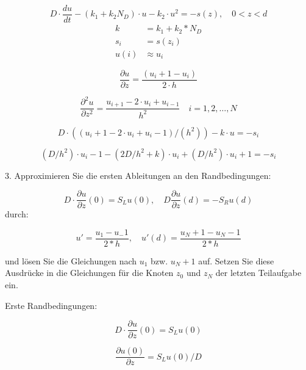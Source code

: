 \begin{equation}
	D\cdot \frac{du}{dt} -\left( k_1 +k_2 N_D\right)\cdot u-k_2\cdot u^2=-s(z), \quad 0 <z<d
\end{equation}\label{eq:stationDGL}
\begin{align*}
	k&=k_1+k_2*N_D\\
	s_i&=s(z_i)\\
	u(i)&\approx u_i
\end{align*}

\begin{equation}
	\frac{\partial u}{\partial z} = \frac{(u_i+1 - u_i)}{2\cdot h}
\end{equation}

\begin{equation}
	\frac{\partial ^2 u }{\partial z^2} = \frac{u_{i+1} - 2\cdot u_i + u_{i-1}}{h^2} \quad i=1,2,\dots,N
\end{equation}

\begin{equation}
	D\cdot ((u_i+1 - 2\cdot u_i + u_i-1)/(h^2)) -k\cdot u = -s_i
\end{equation}

\begin{equation}
	(D/h^2)\cdot u_i-1 - (2D/h^2+k)\cdot u_i + (D/h^2)\cdot u_i+1 = -s_i
\end{equation}

3. Approximieren Sie die ersten Ableitungen an den Randbedingungen:

\begin{equation}
	D\cdot \frac{\partial u}{\partial z}(0)=S_Lu(0),\quad D\frac{\partial u}{\partial z}(d)=-S_Ru(d)
\end{equation}
durch:

\begin{equation}
	u' = \frac{u_1-u_-1}{2*h}, \quad u'(d) = \frac{u_N+1-u_N-1}{2*h}
\end{equation}

und lösen Sie die Gleichungen nach $u_1$ bzw. $u_N+1$ auf. Setzen Sie diese Ausdrücke in die Gleichungen für die Knoten $z_0$ und $z_N$ der letzten Teilaufgabe ein.

Erste Randbedingungen:

\begin{equation}
	D\cdot \frac{\partial u}{\partial z}(0)=S_Lu(0)
\end{equation}

\begin{equation}
	\frac{\partial u(0)}{\partial z}=S_Lu(0)/D	
\end{equation}

